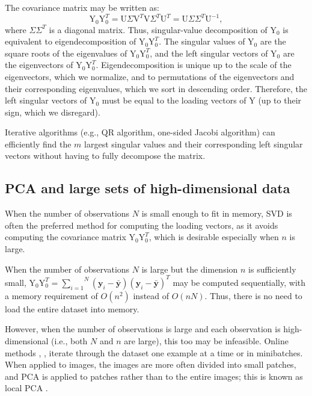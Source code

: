 The covariance matrix may be written as:
\[
\text{Y}_0 \text{Y}_0^T = \text{U} \Sigma \text{V}^T \text{V} \Sigma^T  \text{U}^T =  \text{U} \Sigma \Sigma^T \text{U}^{-1},
\]
where $\Sigma \Sigma^T$ is a diagonal matrix. Thus, singular-value decomposition of $\text{Y}_0$ is equivalent to eigendecomposition of $\text{Y}_0 \text{Y}_0^T$. The singular values of $\text{Y}_0$ are the square roots of the eigenvalues of $\text{Y}_0 \text{Y}_0^T$, and the left singular vectors of $\text{Y}_0$ are the eigenvectors of $\text{Y}_0 \text{Y}_0^T$. Eigendecomposition is unique up to the scale of the eigenvectors, which we normalize, and to permutations of the eigenvectors and their corresponding eigenvalues, which we sort in descending order. Therefore, the left singular vectors of $\text{Y}_0$ must be equal to the loading vectors of $\text{Y}$ (up to their sign, which we disregard).

Iterative algorithms (e.g., QR algorithm, one-sided Jacobi algorithm) can efficiently find the $m$ largest singular values and their corresponding left singular vectors without having to fully decompose the matrix.

\subsection{PCA and large sets of high-dimensional data}
When the number of observations $N$ is small enough to fit in memory, SVD is often the preferred method for computing the loading vectors, as it avoids computing the covariance matrix $\text{Y}_0 \text{Y}_0^T$, which is desirable especially when $n$ is large. 

When the number of observations $N$ is large but the dimension $n$ is sufficiently small, $\text{Y}_0 \text{Y}_0^T = \overset{N}{\underset{i=1}{\sum}} \left(\textbf{y}_i-\bar{\textbf{y}}\right) \left(\textbf{y}_i-\bar{\textbf{y}}\right)^T$ may be computed sequentially, with a memory requirement of $O \left( n^2 \right)$ instead of $O \left( nN \right)$. Thus, there is no need to load the entire dataset into memory.

However, when the number of observations is large and each observation is high-dimensional (i.e., both $N$ and $n$ are large), this too may be infeasible. Online methods \cite{Online1}, \cite{Online2}, \cite{Online3} iterate through the dataset one example at a time or in minibatches. When applied to images, the images are more often divided into small patches, and PCA is applied to patches rather than to the entire images; this is known as local PCA \cite{LocalPCA}.

